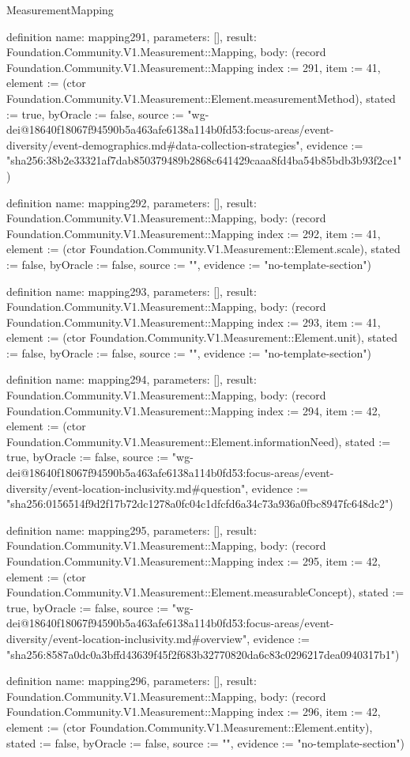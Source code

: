 \begin{lexlean}{MeasurementMapping}
\begin{semanticmodule}
definition{
  name: mapping291,
  parameters: [],
  result: Foundation.Community.V1.Measurement::Mapping,
  body: (record Foundation.Community.V1.Measurement::Mapping {index := 291, item := 41, element := (ctor Foundation.Community.V1.Measurement::Element.measurementMethod), stated := true, byOracle := false, source := "wg-dei@18640f18067f94590b5a463afe6138a114b0fd53:focus-areas/event-diversity/event-demographics.md#data-collection-strategies", evidence := "sha256:38b2e33321af7dab850379489b2868c641429caaa8fd4ba54b85bdb3b93f2ce1"})
}

definition{
  name: mapping292,
  parameters: [],
  result: Foundation.Community.V1.Measurement::Mapping,
  body: (record Foundation.Community.V1.Measurement::Mapping {index := 292, item := 41, element := (ctor Foundation.Community.V1.Measurement::Element.scale), stated := false, byOracle := false, source := "", evidence := "no-template-section"})
}

definition{
  name: mapping293,
  parameters: [],
  result: Foundation.Community.V1.Measurement::Mapping,
  body: (record Foundation.Community.V1.Measurement::Mapping {index := 293, item := 41, element := (ctor Foundation.Community.V1.Measurement::Element.unit), stated := false, byOracle := false, source := "", evidence := "no-template-section"})
}

definition{
  name: mapping294,
  parameters: [],
  result: Foundation.Community.V1.Measurement::Mapping,
  body: (record Foundation.Community.V1.Measurement::Mapping {index := 294, item := 42, element := (ctor Foundation.Community.V1.Measurement::Element.informationNeed), stated := true, byOracle := false, source := "wg-dei@18640f18067f94590b5a463afe6138a114b0fd53:focus-areas/event-diversity/event-location-inclusivity.md#question", evidence := "sha256:0156514f9d2f17b72dc1278a0fc04c1dfcfd6a34c73a936a0fbc8947fc648dc2"})
}

definition{
  name: mapping295,
  parameters: [],
  result: Foundation.Community.V1.Measurement::Mapping,
  body: (record Foundation.Community.V1.Measurement::Mapping {index := 295, item := 42, element := (ctor Foundation.Community.V1.Measurement::Element.measurableConcept), stated := true, byOracle := false, source := "wg-dei@18640f18067f94590b5a463afe6138a114b0fd53:focus-areas/event-diversity/event-location-inclusivity.md#overview", evidence := "sha256:8587a0dc0a3bffd43639f45f2f683b32770820da6c83c0296217dea0940317b1"})
}

definition{
  name: mapping296,
  parameters: [],
  result: Foundation.Community.V1.Measurement::Mapping,
  body: (record Foundation.Community.V1.Measurement::Mapping {index := 296, item := 42, element := (ctor Foundation.Community.V1.Measurement::Element.entity), stated := false, byOracle := false, source := "", evidence := "no-template-section"})
}


\end{semanticmodule}
\end{lexlean}
